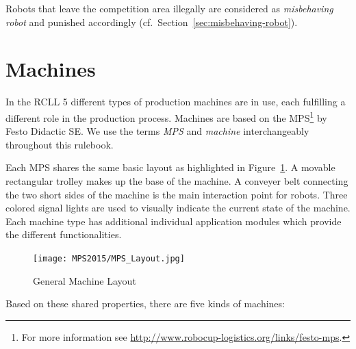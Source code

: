 \documentclass[12pt,twoside]{article}
\newcommand{\refsec}[1]{Section~\ref{#1}}
\newcommand{\reffig}[1]{Figure~\ref{#1}}
\begin{document}
Robots that leave the competition area illegally are considered as
\emph{misbehaving robot} and punished accordingly
(cf.~\refsec{sec:misbehaving-robot}).

\section{Machines}
\label{sec:machines}
In the \ac{RCLL} 5 different types of production machines are
in use, each fulfilling a different role in the production process. Machines are
based on the \acf{MPS}\footnote{For
  more information see
  \url{http://www.robocup-logistics.org/links/festo-mps}.} by Festo
Didactic SE\@.
We use the terms \textit{MPS} and \textit{machine} interchangeably throughout
this rulebook.

Each \ac{MPS} shares the same basic layout as highlighted
in \reffig{fig:MPS-Layout}.
A movable rectangular trolley makes up the base of the machine.
A conveyer belt connecting the two short sides of
the machine is the main interaction point for robots.
Three colored signal lights are used to visually indicate the current state of
the machine.
Each machine type has additional individual application modules which provide
the different functionalities.


\begin{figure}[bh!]
  \centering
  \label{fig:MPS-Layout}
  \texttt{[image: MPS2015/MPS\_Layout.jpg]}
  \caption{General Machine Layout}
\end{figure}


Based on these shared properties, there are five kinds of machines:
\end{document}
